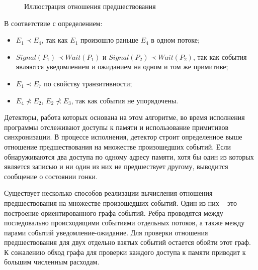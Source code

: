 \begin{figure}
\caption{Иллюстрация отношения предшествования}
\label{fig:happens-before}
\end{figure}

В соответствие с определением:
\begin{itemize}
\item $E_1 \prec E_4$, так как $E_1$ произошло раньше $E_4$ в одном потоке;
\item $Signal(P_1) \prec Wait(P_1)$ и $Signal(P_2) \prec Wait(P_2)$, так как события являются уведомлением и ожиданием на одном и том же примитиве; 
\item $E_1 \prec E_7$ по свойству транзитивности;
\item $E_4 \nprec E_2$, $E_2 \nprec E_3$, так как события не упорядочены.
\end{itemize}

Детекторы, работа которых основана на этом алгоритме, во время исполнения программы отслеживают доступы к памяти и использование примитивов синхронизации.
В процессе исполнения, детектор строит определенное выше отношение предшествования на множестве произошедших событий.
Если обнаруживаются два доступа по одному адресу памяти, хотя бы один из которых является записью и ни один из них не предшествует другому, выводится сообщение о состоянии гонки.

Существует несколько способов реализации вычисления отношения предшествования на множестве произошедших событий.
Один из них -- это построение ориентированного графа событий.
Ребра проводятся между последовально происходящими событиями отдельных потоков, а также между парами событий уведомление-ожидание.
Для проверки отношения предшествования для двух отдельно взятых событий остается обойти этот граф.
К сожалению обход графа для проверки каждого доступа к памяти приводит к большим численным расходам.

